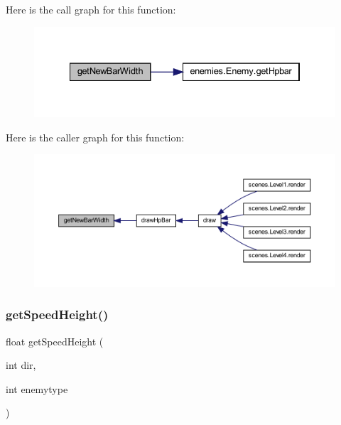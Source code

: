 Here is the call graph for this function\+:\nopagebreak
\begin{figure}[H]
\begin{center}
\leavevmode
\includegraphics[width=334pt]{classmanagers_1_1_enemy_manager_ac01087314c8b4df0d2304a3596493393_cgraph}
\end{center}
\end{figure}
Here is the caller graph for this function\+:\nopagebreak
\begin{figure}[H]
\begin{center}
\leavevmode
\includegraphics[width=350pt]{classmanagers_1_1_enemy_manager_ac01087314c8b4df0d2304a3596493393_icgraph}
\end{center}
\end{figure}
\mbox{\label{classmanagers_1_1_enemy_manager_a263c83da9aebeac50b60770fb847f331}} 
\subsubsection{\texorpdfstring{get\+Speed\+Height()}{getSpeedHeight()}}
{\footnotesize\ttfamily float get\+Speed\+Height (\begin{DoxyParamCaption}\item[{int}]{dir,  }\item[{int}]{enemytype }\end{DoxyParamCaption})}



